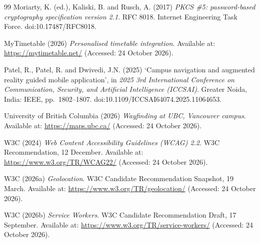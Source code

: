\documentclass[12pt,a4paper]{report}
\begin{document}
\begin{thebibliography}{99}
Moriarty, K. (ed.), Kaliski, B. and Rusch, A. (2017) \emph{PKCS \#5: password-based cryptography specification version 2.1}. RFC 8018. Internet Engineering Task Force. doi:10.17487/RFC8018.

MyTimetable (2026) \emph{Personalised timetable integration}. Available at: \url{https://mytimetable.net/} (Accessed: 24 October 2026).

Patel, R., Patel, R. and Dwivedi, J.N. (2025) `Campus navigation and augmented reality guided mobile application', in \emph{2025 3rd International Conference on Communication, Security, and Artificial Intelligence (ICCSAI)}. Greater Noida, India: IEEE, pp.~1802--1807. doi:10.1109/ICCSAI64074.2025.11064653.

University of British Columbia (2026) \emph{Wayfinding at UBC, Vancouver campus}. Available at: \url{https://maps.ubc.ca/} (Accessed: 24 October 2026).

W3C (2024) \emph{Web Content Accessibility Guidelines (WCAG) 2.2}. W3C Recommendation, 12 December. Available at: \url{https://www.w3.org/TR/WCAG22/} (Accessed: 24 October 2026).

W3C (2026a) \emph{Geolocation}. W3C Candidate Recommendation Snapshot, 19 March. Available at: \url{https://www.w3.org/TR/geolocation/} (Accessed: 24 October 2026).

W3C (2026b) \emph{Service Workers}. W3C Candidate Recommendation Draft, 17 September. Available at: \url{https://www.w3.org/TR/service-workers/} (Accessed: 24 October 2026).

\end{thebibliography}

\appendix
\renewcommand{\chaptername}{Appendix}
\end{document}

